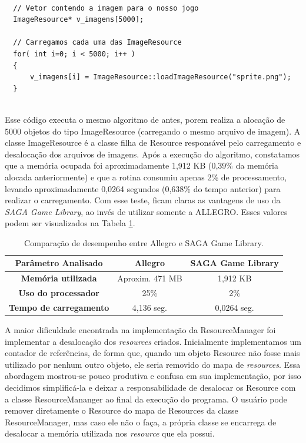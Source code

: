 %
%
\begin{lstlisting}

  // Vetor contendo a imagem para o nosso jogo
  ImageResource* v_imagens[5000];
	
  // Carregamos cada uma das ImageResource
  for( int i=0; i < 5000; i++ )
  {
      v_imagens[i] = ImageResource::loadImageResource("sprite.png");
  }
	      
\end{lstlisting}
%
\par 
Esse código executa o mesmo algoritmo de antes, porem realiza a alocação de 5000 objetos do tipo ImageResource (carregando o mesmo arquivo de imagem). A classe ImageResource é a classe filha de Resource responsável pelo carregamento e desalocação dos arquivos de imagens. Após a execução do algoritmo, constatamos que a memória ocupada foi aproximadamente 1,912 KB (0,39\% da memória alocada anteriormente) e que a rotina consumiu apenas 2\% de processamento, levando aproximadamente 0,0264 segundos (0,638\% do tempo anterior) para realizar o carregamento. Com esse teste, ficam claras as vantagens de uso da \textit{SAGA Game Library}, ao invés de utilizar somente a ALLEGRO. Esses valores podem ser visualizados na Tabela \ref{tabelaEconomia}.
%
% 
\begin{table}
\centering
\caption{Comparação de desempenho entre Allegro e SAGA Game Library.}
\begin{tabular}{|c|c|c|}\hline
\textbf{Parâmetro Analisado} & \textbf{Allegro} & \textbf{SAGA Game Library}\\\hline
\textbf{Memória utilizada} & Aproxim. 471 MB & 1,912 KB\\\hline
\textbf{Uso do processador} & 25\% & 2\% \\\hline
\textbf{Tempo de carregamento} & 4,136 seg. & 0,0264 seg.\\\hline
\end{tabular}
\label{tabelaEconomia}
\end{table}
%
%
\par
A maior dificuldade encontrada na implementação da ResourceManager foi implementar a desalocação dos \textit{resources} criados. Inicialmente implementamos um contador de referências, de forma que, quando um objeto Resource não fosse mais utilizado por nenhum outro objeto, ele seria removido do mapa de \textit{resources}. Essa abordagem mostrou-se pouco produtiva e confusa em sua implementação, por isso decidimos simplificá-la e deixar a responsabilidade de desalocar os Resource com a classe ResourceMananger ao final da execução do programa. O usuário pode remover diretamente o Resource do mapa de Resources da classe ResourceManager, mas caso ele não o faça, a própria classe se encarrega de desalocar a memória utilizada nos \textit{resource} que ela possui.
%
%
%
